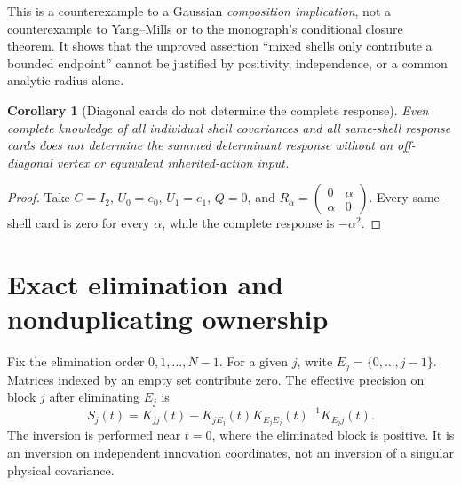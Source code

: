 \documentclass[11pt,a4paper]{article}
\newtheorem{corollary}[corollary]{Corollary}
\theoremstyle{definition}
\theoremstyle{remark}
\begin{document}
This is a counterexample to a Gaussian \emph{composition implication},
not a counterexample to Yang--Mills or to the monograph's conditional
closure theorem. It shows that the unproved assertion ``mixed shells
only contribute a bounded endpoint'' cannot be justified by positivity,
independence, or a common analytic radius alone.

\begin{corollary}[Diagonal cards do not determine the complete response]
\label{cor:v1-cards}
Even complete knowledge of all individual shell covariances and all
same-shell response cards does not determine the summed determinant
response without an off-diagonal vertex or equivalent inherited-action
input.
\end{corollary}
\begin{proof}
Take $C=I_2$, $U_0=e_0$, $U_1=e_1$, $Q=0$, and
$R_\alpha=\left(\begin{smallmatrix}0&\alpha\\\alpha&0\end{smallmatrix}\right)$.
Every same-shell card is zero for every $\alpha$, while the complete
response is $-\alpha^2$.
\end{proof}

\section{Exact elimination and nonduplicating ownership}
\label{sec:v1-owner}

Fix the elimination order $0,1,\ldots,N-1$. For a given $j$, write
$E_j=\{0,\ldots,j-1\}$. Matrices indexed by an empty set contribute zero.
The effective precision on block $j$ after eliminating $E_j$ is
\begin{equation}\label{eq:v1-Schurj}
 S_j(t)=K_{jj}(t)-K_{jE_j}(t)K_{E_jE_j}(t)^{-1}K_{E_jj}(t).
\end{equation}
The inversion is performed near $t=0$, where the eliminated block is
positive. It is an inversion on independent innovation coordinates,
not an inversion of a singular physical covariance.
\end{document}
